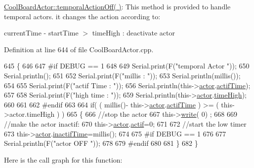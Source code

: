 \hyperlink{class_cool_board_actor_a02698bd647df49cabbe74513d4d88918}{Cool\+Board\+Actor\+::temporal\+Action\+Off( )}\+: This method is provided to handle temporal actors. it changes the action according to\+:

current\+Time -\/ start\+Time $>$ time\+High \+: deactivate actor 

Definition at line 644 of file Cool\+Board\+Actor.\+cpp.


\begin{DoxyCode}
645 \{
646 
647 \textcolor{preprocessor}{#if DEBUG == 1}
648     
649     Serial.print(F(\textcolor{stringliteral}{"temporal Actor  "}));
650     Serial.println();
651 
652     Serial.print(F(\textcolor{stringliteral}{"millis : "}));
653     Serial.println(millis());
654 
655     Serial.print(F(\textcolor{stringliteral}{"actif Time : "}));
656     Serial.println(this->\hyperlink{class_cool_board_actor_a8f190db9f7a39fddbcef7f152da970e9}{actor}.\hyperlink{struct_cool_board_actor_1_1state_a534119a22a09b29ecb446b277d5b2ef5}{actifTime});
657 
658     Serial.print(F(\textcolor{stringliteral}{"high time : "}));
659     Serial.println(this->\hyperlink{class_cool_board_actor_a8f190db9f7a39fddbcef7f152da970e9}{actor}.\hyperlink{struct_cool_board_actor_1_1state_a54cd4976b56aeaa6274fe0576aaebb0f}{timeHigh});
660 
661 
662 \textcolor{preprocessor}{#endif}
663     
664     \textcolor{keywordflow}{if}( ( millis()- this->\hyperlink{class_cool_board_actor_a8f190db9f7a39fddbcef7f152da970e9}{actor}.\hyperlink{struct_cool_board_actor_1_1state_a534119a22a09b29ecb446b277d5b2ef5}{actifTime}  ) >= (  this->actor.timeHigh  ) )
665     \{
666         \textcolor{comment}{//stop the actor}
667         this->\hyperlink{class_cool_board_actor_a958786ff01ea1056ee72c72d439f86da}{write}( 0) ;
668 
669         \textcolor{comment}{//make the actor inactif:}
670         this->\hyperlink{class_cool_board_actor_a8f190db9f7a39fddbcef7f152da970e9}{actor}.\hyperlink{struct_cool_board_actor_1_1state_a7963178c2de01ef0d2861f9f59ad6f3c}{actif}=0;
671 
672         \textcolor{comment}{//start the low timer}
673         this->\hyperlink{class_cool_board_actor_a8f190db9f7a39fddbcef7f152da970e9}{actor}.\hyperlink{struct_cool_board_actor_1_1state_a6d88835f4402b3b81cd404784281854b}{inactifTime}=millis();
674 
675 \textcolor{preprocessor}{    #if DEBUG == 1 }
676 
677         Serial.println(F(\textcolor{stringliteral}{"actor OFF "}));
678     
679 \textcolor{preprocessor}{    #endif}
680                 
681     \}   
682 \}
\end{DoxyCode}
Here is the call graph for this function\+:\nopagebreak
